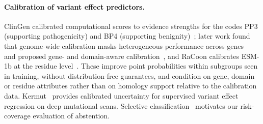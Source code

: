 \paragraph{Calibration of variant effect predictors.}
ClinGen calibrated computational scores to evidence strengths for the codes PP3 (supporting pathogenicity) and BP4 (supporting benignity)~\cite{pejaver2022calibration}; later work found that genome-wide calibration masks heterogeneous performance across genes~\cite{tejura2024calibration} and proposed gene- and domain-aware calibration~\cite{chen2026gene}, and RaCoon calibrates ESM-1b at the residue level~\cite{passi2025racoon}. These improve point probabilities within subgroups seen in training, without distribution-free guarantees, and condition on gene, domain or residue attributes rather than on homology support relative to the calibration data. Kermut~\cite{groth2024kermut} provides calibrated uncertainty for supervised variant effect regression on deep mutational scans. Selective classification~\cite{geifman2017selective} motivates our risk-coverage evaluation of abstention.
